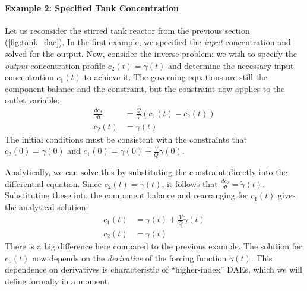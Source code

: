 \paragraph*{Example 2: Specified Tank Concentration}

Let us reconsider the stirred tank reactor from the previous section (\autoref{fig:tank_dae}). In the first example, we specified the \textit{input} concentration and solved for the output. Now, consider the inverse problem: we wish to specify the \textit{output} concentration profile $c_2(t) = \gamma(t)$ and determine the necessary input concentration $c_1(t)$ to achieve it. The governing equations are still the component balance and the constraint, but the constraint now applies to the outlet variable:
\begin{align}
    \frac{dc_2}{dt} &= \frac{Q}{V}(c_1(t) - c_2(t)) \\
    c_2(t) &= \gamma(t)
\end{align}
The initial conditions must be consistent with the constraints that $c_2(0) = \gamma(0)$ and $c_1(0) = \gamma(0) + \frac{V}{Q}\dot{\gamma}(0)$.

Analytically, we can solve this by substituting the constraint directly into the differential equation. Since $c_2(t) = \gamma(t)$, it follows that $\frac{dc_2}{dt} = \dot{\gamma}(t)$. Substituting these into the component balance and rearranging for $c_1(t)$ gives the analytical solution:
\begin{align}
    c_1(t) &= \gamma(t) + \frac{V}{Q}\dot{\gamma}(t) \\
    c_2(t) &= \gamma(t)
\end{align}
There is a big difference here compared to the previous example. The solution for $c_1(t)$ now depends on the \textit{derivative} of the forcing function $\dot{\gamma}(t)$. This dependence on derivatives is characteristic of ``higher-index'' DAEs, which we will define formally in a moment.

